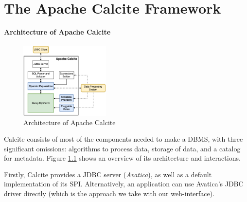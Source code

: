 \chapter{The Apache Calcite Framework}
\label{appendix:calcite}

\subsubsection{Architecture of Apache Calcite}

\begin{figure}[H]
\includegraphics[width=0.4\textwidth]{appendix/calcite-architecture.png}
\centering
\caption{Architecture of Apache Calcite \cite{Begoli:2018:ACF:3183713.3190662}}
\label{fig:calcite-architecture}
\end{figure}

Calcite consists of most of the components needed to make a DBMS, with three significant omissions: algorithms to process data, storage of data, and a catalog for metadata. Figure \ref{fig:calcite-architecture} shows an overview of its architecture and interactions.

Firstly, Calcite provides a JDBC server (\emph{Avatica}), as well as a default implementation of its SPI. Alternatively, an application can use Avatica's JDBC driver directly (which is the approach we take with our web-interface).

